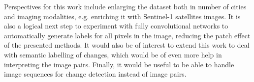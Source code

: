 \documentclass{article}
\begin{document}

Perspectives for this work include enlarging the dataset both in number of cities and imaging modalities, e.g. enriching it with Sentinel-1 satellites images.
It is also a logical next step to experiment with fully convolutional networks to automatically generate labels for all pixels in the image, reducing the patch effect of the presented methods. It would also be of interest to extend this work to deal with semantic labelling of changes, which would be of even more help in interpreting the image pairs. Finally, it would be useful to be able to handle image sequences for change detection instead of image pairs.









\end{document}
